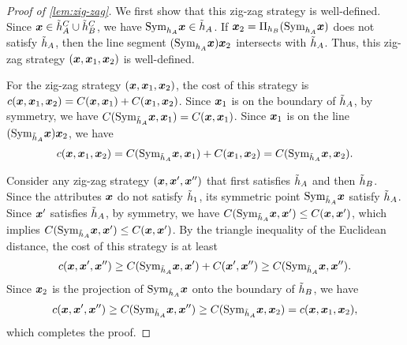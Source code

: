 \begin{proof}[Proof of \cref{lem:zig-zag}]
    We first show that this zig-zag strategy is well-defined. Since $\boldsymbol{x} \in \tilde {h}_A^C \cup \tilde {h}_B^C$, we have $\boldsymbol{\text{Sym}}_{h_A}\boldsymbol{x} \in \tilde{h}_A$. 
    If $\boldsymbol{x}_2 = \Pi_{h_B}(\boldsymbol{\text{Sym}}_{h_A}\boldsymbol{x})$ does not satisfy $\tilde{h}_A$, then the line segment $(\boldsymbol{\text{Sym}}_{h_A}\boldsymbol{x})\boldsymbol{x}_2$ intersects with $\tilde{h}_A$. 
    Thus, this zig-zag strategy $(\boldsymbol{x},\boldsymbol{x}_1,\boldsymbol{x}_2)$ is well-defined.
    
    For the zig-zag strategy $(\boldsymbol{x},\boldsymbol{x}_1,\boldsymbol{x}_2)$, the cost of this strategy is $c(\boldsymbol{x},\boldsymbol{x}_1,\boldsymbol{x}_2) = C(\boldsymbol{x},\boldsymbol{x}_1) + C(\boldsymbol{x}_1,\boldsymbol{x}_2)$. Since $\boldsymbol{x}_1$ is on the boundary of $\tilde{h}_A$, by symmetry, we have $C(\boldsymbol{\text{Sym}}_{\tilde{h}_A}\boldsymbol{x},\boldsymbol{x}_1) = C(\boldsymbol{x},\boldsymbol{x}_1)$. Since $\boldsymbol{x}_1$ is on the line $(\boldsymbol{\text{Sym}}_{\tilde{h}_A}\boldsymbol{x})\boldsymbol{x}_2$, we have
    $$    c(\boldsymbol{x},\boldsymbol{x}_1,\boldsymbol{x}_2) = C(\boldsymbol{\text{Sym}}_{\tilde{h}_A}\boldsymbol{x},\boldsymbol{x}_1) + C(\boldsymbol{x}_1,\boldsymbol{x}_2) = C(\boldsymbol{\text{Sym}}_{\tilde{h}_A}\boldsymbol{x}, \boldsymbol{x}_2).
    $$
    
    Consider any zig-zag strategy $(\boldsymbol{x}, \boldsymbol{x}',\boldsymbol{x}'')$ that first satisfies $\tilde{h}_A$ and then $\tilde{h}_B$.
    Since the attributes $\boldsymbol{x}$ do not satisfy $\tilde{h}_1$, its symmetric point $\boldsymbol{\text{Sym}}_{\tilde{h}_A} \boldsymbol{x}$ satisfy $\tilde{h}_A$.
    Since $\boldsymbol{x}'$ satisfies $\tilde {h}_A$, by symmetry, we have $C(\boldsymbol{\text{Sym}}_{\tilde{h}_A}\boldsymbol{x}, \boldsymbol{x}') \leq C(\boldsymbol{x}, \boldsymbol{x}')$, which implies $C(\boldsymbol{\text{Sym}}_{\tilde{h}_A}\boldsymbol{x}, \boldsymbol{x}') \leq C(\boldsymbol{x}, \boldsymbol{x}')$. 
    By the triangle inequality of the Euclidean distance, the cost of this strategy is at least
    $$
    c(\boldsymbol{x},\boldsymbol{x}',\boldsymbol{x}'') \geq C(\boldsymbol{\text{Sym}}_{\tilde{h}_A}\boldsymbol{x}, \boldsymbol{x}') + C(\boldsymbol{x}',\boldsymbol{x}'') \geq C(\boldsymbol{\text{Sym}}_{\tilde{h}_A}\boldsymbol{x}, \boldsymbol{x}'').
    $$
    Since $\boldsymbol{x}_2$ is the projection of $\boldsymbol{\text{Sym}}_{\tilde{h}_A} \boldsymbol{x}$ onto the boundary of $\tilde{h}_B$, we have $$c(\boldsymbol{x},\boldsymbol{x}',\boldsymbol{x}'') \geq C(\boldsymbol{\text{Sym}}_{\tilde{h}_A}\boldsymbol{x}, \boldsymbol{x}'') \geq C(\boldsymbol{\text{Sym}}_{\tilde{h}_A}\boldsymbol{x}, \boldsymbol{x}_2) = c(\boldsymbol{x},\boldsymbol{x}_1,\boldsymbol{x}_2),$$
    which completes the proof.
\end{proof}

